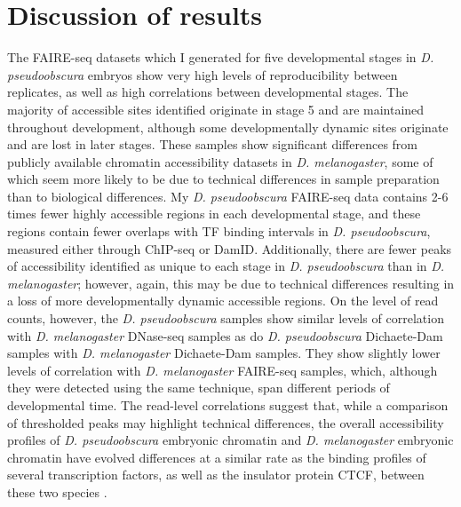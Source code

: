 \section{Discussion of results}
The FAIRE-seq datasets which I generated for five developmental stages in \emph{D. pseudoobscura} embryos show very high levels of reproducibility between replicates, as well as high correlations between developmental stages. The majority of accessible sites identified originate in stage 5 and are maintained throughout development, although some developmentally dynamic sites originate and are lost in later stages. These samples show significant differences from publicly available chromatin accessibility datasets in \emph{D. melanogaster}, some of which seem more likely to be due to technical differences in sample preparation than to biological differences. My \emph{D. pseudoobscura} FAIRE-seq data contains 2-6 times fewer highly accessible regions in each developmental stage, and these regions contain fewer overlaps with TF binding intervals in \emph{D. pseudoobscura}, measured either through ChIP-seq or DamID. Additionally, there are fewer peaks of accessibility identified as unique to each stage in \emph{D. pseudoobscura} than in \emph{D. melanogaster}; however, again, this may be due to technical differences resulting in a loss of more developmentally dynamic accessible regions. On the level of read counts, however, the \emph{D. pseudoobscura} samples show similar levels of correlation with \emph{D. melanogaster} DNase-seq samples as do \emph{D. pseudoobscura} Dichaete-Dam samples with \emph{D. melanogaster} Dichaete-Dam samples. They show slightly lower levels of correlation with \emph{D. melanogaster} FAIRE-seq samples, which, although they were detected using the same technique, span different periods of developmental time. The read-level correlations suggest that, while a comparison of thresholded peaks may highlight technical differences, the overall accessibility profiles of \emph{D. pseudoobscura} embryonic chromatin and \emph{D. melanogaster} embryonic chromatin have evolved differences at a similar rate as the binding profiles of several transcription factors, as well as the insulator protein CTCF, between these two species \citep{he_high_2011,ni_adaptive_2012,paris_extensive_2013}.

